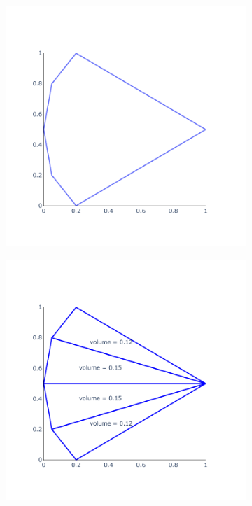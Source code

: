 \begin{figure}[h]\centering
	\begin{subfigure}{.45\textwidth}
		\centering
		\includegraphics[width=1.\textwidth]{./Images/sampling_1}
		\caption{}
		\label{fig:sampling_1}
	\end{subfigure}%
	\begin{subfigure}{.45\textwidth}
		\centering
		\includegraphics[width=1.\textwidth]{./Images/sampling_2}

\end{subfigure}
\end{figure}
